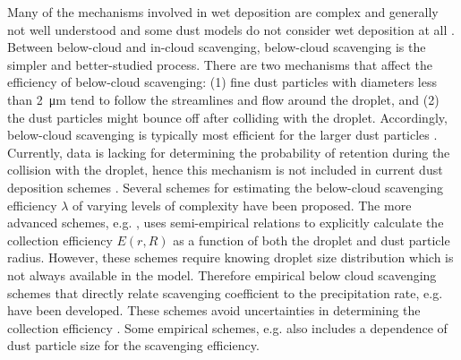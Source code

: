 Many of the mechanisms involved in wet deposition are complex and generally not well understood and some dust models do not consider wet deposition at all \parencite{zhang2019parameterization}. Between below-cloud and in-cloud scavenging, below-cloud scavenging is the simpler and better-studied process.
There are two mechanisms that affect the efficiency of below-cloud scavenging: (1) fine dust particles with diameters less than \SI{2}{\micro\metre} tend to follow the streamlines and flow around the droplet, and (2) the dust particles might bounce off after colliding with the droplet. 
Accordingly, below-cloud scavenging is typically most efficient for the larger dust particles \parencite{jung2006intercomparison}.
Currently, data is lacking for determining the probability of retention during the collision with the droplet, hence this mechanism is not included in current dust deposition schemes \parencite{ShaoYaping2008PaMo}. Several schemes for estimating the below-cloud scavenging efficiency $\lambda$ of varying levels of complexity have been proposed. The more advanced schemes, e.g. \textcite{seinfeld1998atmospheric, ShaoYaping2008PaMo}, uses semi-empirical relations to explicitly calculate the collection efficiency $E(r,R)$ as a function of both the droplet and dust particle radius. However, these schemes require knowing droplet size distribution which is not always available in the model. Therefore empirical below cloud scavenging schemes that directly relate scavenging coefficient to the precipitation rate, e.g. \textcite{brandt2002modelling} have been developed. These schemes avoid uncertainties in determining the collection efficiency \parencite{jung2006intercomparison}. Some empirical schemes, e.g. \textcite{laakso2003ultrafine} also includes a dependence of dust particle size for the scavenging efficiency. 
